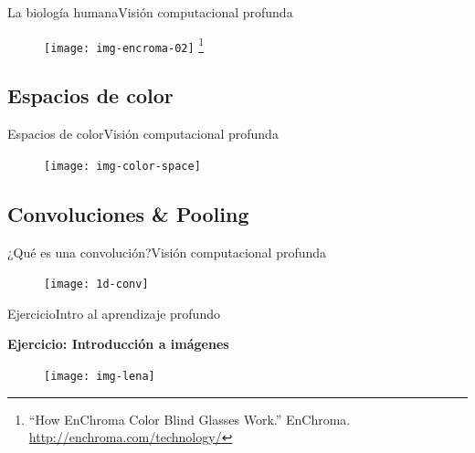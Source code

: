 \documentclass[10pt,border=3pt,tikz]{beamer}
\begin{document}
    \begin{frame}{La biología humana}{Visión computacional profunda}
        \begin{figure}
            \centering
            \texttt{[image: img-encroma-02]}
            \let\thefootnote\relax\footnote{{\tiny “How EnChroma Color Blind Glasses Work.” EnChroma. \url{http://enchroma.com/technology/}}}
        \end{figure}
    \end{frame}
    
    \subsection{Espacios de color}
    \begin{frame}{Espacios de color}{Visión computacional profunda}
        \begin{figure}
            \centering
            \texttt{[image: img-color-space]}
        \end{figure}
    \end{frame}
    
    \subsection{Convoluciones \& Pooling}
    \begin{frame}{¿Qué es una convolución?}{Visión computacional profunda}
        \begin{figure}
            \centering
            \texttt{[image: 1d-conv]}
        \end{figure}
    \end{frame}
    
    \begin{frame}{Ejercicio}{Intro al aprendizaje profundo}
        \begin{center}
            {\Large \textbf{Ejercicio: Introducción a imágenes}}
        \end{center}
        \begin{figure}
            \centering
            \texttt{[image: img-lena]}
        \end{figure}
    \end{frame}
    
\end{document}
